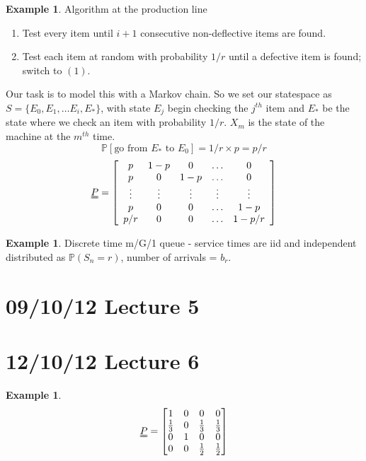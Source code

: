 \documentclass{article}
\theoremstyle{definition}
\newtheorem{ex}[thm]{Example}
\begin{document}
\begin{ex}
Algorithm at the production line
\begin{enumerate}
\item
Test every item until $i+1$ consecutive non-deflective items are found.
\item
Test each item at random  with probability $1/r$ until a defective item is found; switch to $(1)$.
\end{enumerate}
Our task is to model this with a Markov chain. So we set our statespace as $S = \{E_0, E_1, \ldots E_i, E_{\ast} \}$, with state $E_j$ begin checking the $j^{th}$ item and $E_{\ast}$ be the state where we check an item with probability $1/r$. $X_m$ is the state of the machine at the $m^{th}$ time.
\[
\mathbb{P}[ \mbox{go from } E_{\ast} \mbox{ to } E_0 ] = 1/r \times p = p/r
\] 
\[
\uuline{P} = \left [ \begin{array}{ccccc} p & 1-p & 0 & \hdots & 0\\ p & 0 & 1 - p & \hdots & 0\\ \vdots & \vdots & \vdots & \vdots & \vdots\\ p & 0 & 0 & \hdots & 1 - p\\ p/r & 0 & 0 & \hdots & 1 - p/r \end{array} \right ]
\]
\end{ex}

\begin{ex} Discrete time m/G/1 queue - service times are iid and independent distributed as $\mathbb{P}(S_n = r)$, number of arrivals = $b_r$. 
\end{ex}

\section{09/10/12 Lecture 5}

\section{12/10/12 Lecture 6}
\begin{ex}
$$\uuline{P} = \begin{bmatrix}
1 & 0 & 0 & 0 \\
\frac13 & 0 & \frac13 & \frac13 \\
0 & 1 & 0 & 0 \\
0 & 0 & \frac12 & \frac12 \\
\end{bmatrix}$$
\end{ex}
\end{document}
